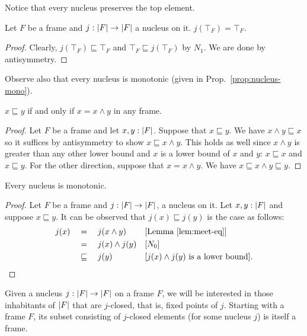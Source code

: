 Notice that every nucleus preserves the top element.
\begin{prop}\label{prop:nucleus-resp-top}
  Let $F$ be a frame and $j\hspace{0.1mm}:\hspace{0.1mm}\left| F \right| \rightarrow \left| F \right|$ a nucleus on it.
  $j(\top_F) = \top_F$.
\end{prop}
\begin{proof}
  Clearly, $j(\top_F) \sqsubseteq \top_F$ and $\top_F \sqsubseteq j(\top_F)$ by $N_1$. We are done by antisymmetry.
\end{proof}

Observe also that every nucleus is monotonic (given in Prop.~\ref{prop:nucleus-mono}).

\begin{lemma}\label{lem:meet-eq}
  $x \sqsubseteq y$ if and only if $x = x \wedge y$ in any frame.
\end{lemma}
\begin{proof}
  Let $F$ be a frame and let $x, y:\left| F \right|$. Suppose that $x \sqsubseteq y$. We have $x \wedge
  y \sqsubseteq x$ so it suffices by antisymmetry to show $x \sqsubseteq x \wedge y$. This holds as well since $x \wedge
  y$ is greater than any other lower bound and $x$ is a lower bound of $x$ and $y$: $x \sqsubseteq
  x$ and $x \sqsubseteq y$. For the other direction, suppose that $x = x \wedge y$. We have $x \sqsubseteq x \wedge y \sqsubseteq
  y$.
\end{proof}

\begin{prop}\label{prop:nucleus-mono}
  Every nucleus is monotonic.
\end{prop}
\begin{proof}
  Let $F$ be a frame and $j : \left| F \right| \rightarrow \left| F \right|$, a nucleus on it. Let
  $x, y:\left| F \right|$ and suppose $x \sqsubseteq y$. It can be observed that $j(x) \sqsubseteq j(y)$ is
  the case as follows:
  \begin{align*}
    j(x) &\quad=\quad j(x \wedge y)        && [\text{Lemma~\ref{lem:meet-eq}}]               \\
         &\quad=\quad j(x) \wedge j(y)     && [N_0]                                          \\
         &\quad\sqsubseteq\quad {j(y)}                && [\text{$j(x) \wedge j(y)$ is a lower bound}]  .
  \end{align*}
\end{proof}

Given a nucleus $j\hspace{0.1mm}:\hspace{0.1mm}\left| F \right| \rightarrow \left| F \right|$ on a frame $F$, we will be interested in
those inhabitants of $\left| F \right|$ that are $j$-closed, that is, fixed points of $j$. Starting
with a frame $F$, its subset consisting of $j$-closed elements (for some nucleus $j$) is
itself a frame.

